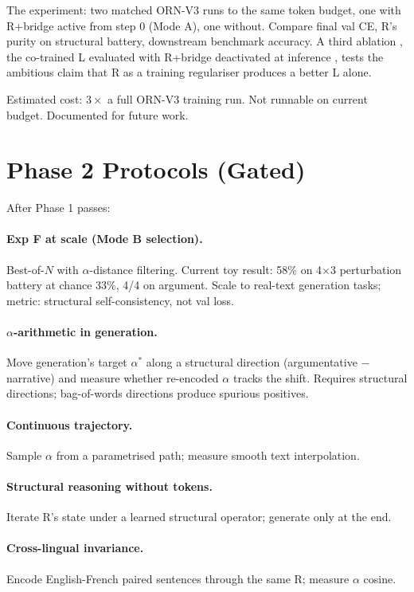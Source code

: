 \documentclass[10pt, twocolumn, a4paper]{article}
\begin{document}
The experiment: two matched ORN-V3 runs to the same token budget, one with R+bridge active from step 0 (Mode A), one without. Compare final val CE, R's purity on structural battery, downstream benchmark accuracy. A third ablation ,  the co-trained L evaluated with R+bridge deactivated at inference ,  tests the ambitious claim that R as a training regulariser produces a better L alone.

Estimated cost: $3\times$ a full ORN-V3 training run. Not runnable on current budget. Documented for future work.


\section{Phase 2 Protocols (Gated)}

After Phase 1 passes:

\paragraph{Exp F at scale (Mode B selection).} Best-of-$N$ with $\alpha$-distance filtering. Current toy result: 58\% on 4$\times$3 perturbation battery at chance 33\%, 4/4 on argument. Scale to real-text generation tasks; metric: structural self-consistency, not val loss.

\paragraph{$\alpha$-arithmetic in generation.} Move generation's target $\alpha^*$ along a structural direction (argumentative $-$ narrative) and measure whether re-encoded $\alpha$ tracks the shift. Requires structural directions; bag-of-words directions produce spurious positives.

\paragraph{Continuous trajectory.} Sample $\alpha$ from a parametrised path; measure smooth text interpolation.

\paragraph{Structural reasoning without tokens.} Iterate R's state under a learned structural operator; generate only at the end.

\paragraph{Cross-lingual invariance.} Encode English-French paired sentences through the same R; measure $\alpha$ cosine.
\end{document}
